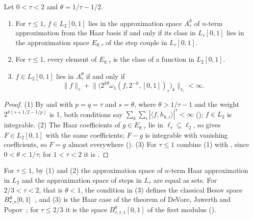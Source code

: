 \begin{theorem}
\label{thm:haar-nterm-besov-all}
\leanok
{}
Let $0 < \tau < 2$ and $\theta = 1/\tau - 1/2$.
\begin{enumerate}
  \item For $\tau \leq 1$, $f \in L_2[0, 1]$ lies in the approximation space $A^\theta_\tau$ of
    $n$-term approximation from the Haar basis if and only if its class in $L_\tau[0, 1]$ lies in
    the approximation space $E_{\theta, \tau}$ of the step couple in $L_\tau[0, 1]$.
  \item For $\tau \leq 1$, every element of $E_{\theta, \tau}$ is the class of a function in
    $L_2[0, 1]$.
  \item $f \in L_2[0, 1]$ lies in $A^\theta_\tau$ if and only if
    \[
      \|f\|_\tau + \bigl\| \bigl( 2^{k\theta} \omega_1(f, 2^{-k}, [0,1])_\tau \bigr)_k
      \bigr\|_{\ell_\tau} < \infty .
    \]
\end{enumerate}
\end{theorem}

\begin{proof}
\leanok
(1) By  and  with $p = q = \tau$ and $s = \theta$,
where $\theta > 1/\tau - 1$ and the weight $2^{k(s + 1/2 - 1/p)}$ is $1$, both conditions say
$\sum_k \sum_i |\langle f, h_{k,i} \rangle|^\tau < \infty$ (); $f \in L_2$ is
integrable. (2) The Haar coefficients of $g \in E_{\theta, \tau}$ lie in
$\ell_\tau \subseteq \ell_2$, so  gives $F \in L_2[0, 1]$ with the same
coefficients; $F - g$ is integrable with vanishing coefficients, so $F = g$ almost everywhere
(). (3) For $\tau \leq 1$ combine (1) with
, since $0 < \theta < 1/\tau$; for $1 < \tau < 2$ it is
.
\end{proof}

For $\tau \leq 1$, by (1) and (2) the approximation space of $n$-term Haar approximation in
$L_2$ and the approximation space of steps in $L_\tau$ are equal as sets. For
$2/3 < \tau < 2$, that is $\theta < 1$, the condition in (3) defines the classical Besov space
$B^{\theta}_{\tau,\tau}[0, 1]$~\cite[\S3.6]{DeVore1998}, and (3) is the Haar case of the
theorem of DeVore, Jawerth and Popov~\cite{DeVoreJawerthPopov}; for $\tau \leq 2/3$ it is the
space $B^\theta_{\tau,\tau,1}[0, 1]$ of the first modulus ().

